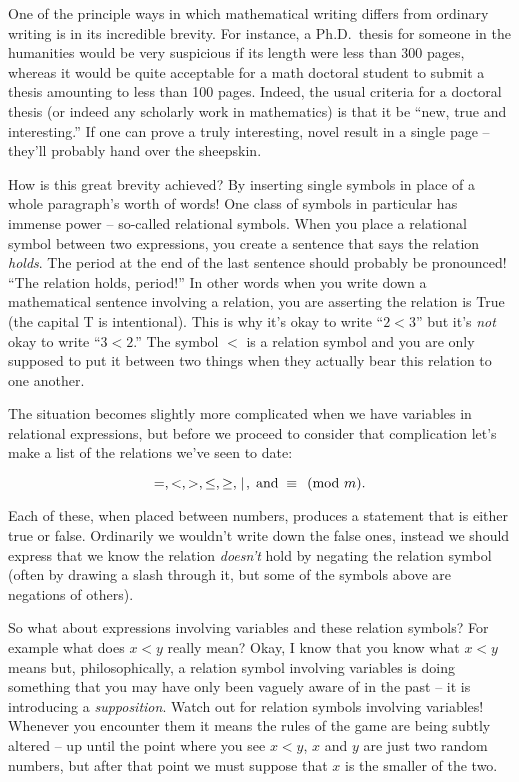 One of the principle ways in which mathematical writing
differs from ordinary writing is in its incredible brevity.  For
instance, a Ph.D.\ thesis for someone in the humanities would be very 
suspicious if its length were less than 300 pages, whereas it would
be quite acceptable for a math doctoral student to submit a thesis
amounting to less than 100 pages.  Indeed, the usual criteria for
a doctoral thesis (or indeed any scholarly work in mathematics) is
that it be ``new, true and interesting.''  If one can prove a truly 
interesting, novel result in a single page -- they'll probably hand over 
the sheepskin.

How is this great brevity achieved?  By inserting single symbols in place
of a whole paragraph's worth of words!  One class of symbols in particular
has immense power -- so-called  relational symbols.  
When you place a relational
symbol between two expressions, you create a sentence that says the
relation \emph{holds}.  The period at the end of the last sentence should
probably be pronounced!  ``The relation holds, period!''  In other words
when you write down a mathematical sentence involving a relation, you 
are asserting the relation is True (the capital T is intentional).
This is why it's okay to write ``$2 < 3$'' but it's \emph{not} okay to
write ``$3 < 2$.''  The symbol $<$ is a relation symbol and you are
only supposed to put it between two things when they actually bear this
relation to one another.

The situation becomes slightly more complicated when we have 
variables in relational expressions, but before we proceed to
consider that complication let's make a list of the relations
we've seen to date:

\[ =, <, >, \leq, \geq,\; \!\mid\! \; , \; \mbox{and} \; \equiv \pmod{m}. \] 

Each of these, when placed between numbers, produces a statement that
is either true or false.  Ordinarily we wouldn't write down the 
false ones, instead we should express that we know the relation
\emph{doesn't} hold by negating the relation symbol (often by
drawing a slash through it, but some of the symbols above are
negations of others).

So what about expressions involving variables and these relation symbols?
For example what does $x < y$ really mean?  Okay, I know that you know 
what $x < y$ means but, philosophically, a relation symbol involving variables
is doing something that you may have only been vaguely aware of in the 
past -- it is introducing a \emph{supposition}.  Watch out for relation
symbols involving variables!  Whenever you encounter them it means the 
rules of the game are being subtly altered -- up until the point where 
you see $x < y$, $x$ and $y$ are just two random numbers, but after that
point we must suppose that $x$ is the smaller of the two.

